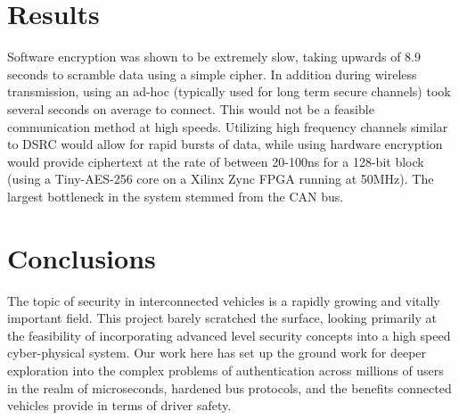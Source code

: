 \documentclass[a0,landscape]{a0poster}
\begin{document}
\begin{multicols}{3}
\section*{Results}
Software encryption was shown to be extremely slow, taking upwards of 8.9 seconds to scramble data using a simple cipher. In addition during wireless transmission, using an ad-hoc (typically used for long term secure channels) took several seconds on average to connect. This would not be a feasible communication method at high speeds. Utilizing high frequency channels similar to DSRC would allow for rapid bursts of data, while using hardware encryption would provide ciphertext at the rate of between 20-100ns for a 128-bit block (using a Tiny-AES-256 core on a Xilinx Zync FPGA running at 50MHz). The largest bottleneck in the system stemmed from the CAN bus.



\color{SaddleBrown} %

\section*{Conclusions}
The topic of security in interconnected vehicles is a rapidly growing and vitally important field. This project barely scratched the surface, looking primarily at the feasibility of incorporating advanced level security concepts into a high speed cyber-physical system. Our work here has set up the ground work for deeper exploration into the complex problems of authentication across millions of users in the realm of microseconds, hardened bus protocols, and the benefits connected vehicles provide in terms of driver safety.



\end{multicols}
\end{document}
